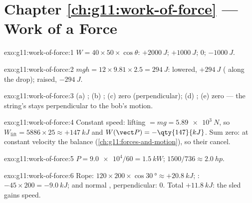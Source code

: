 \section*{Chapter \ref{ch:g11:work-of-force} --- Work of a Force}

\begin{solution}{exo:g11:work-of-force:1}
$W = 40 \times 50 \times \cos\theta$: $+\qty{2000}{J}$;
$+\qty{1000}{J}$; $0$; $-\qty{1000}{J}$.
\end{solution}

\begin{solution}{exo:g11:work-of-force:2}
$mgh = 12 \times 9.81 \times 2.5 = \qty{294}{J}$: lowered,
$+\qty{294}{J}$ ( along the drop); raised, $-\qty{294}{J}$.
\end{solution}

\begin{solution}{exo:g11:work-of-force:3}
(a) ; (b) ; (c) zero (perpendicular); (d) ;
(e) zero --- the string's  stays perpendicular to the bob's
motion.
\end{solution}

\begin{solution}{exo:g11:work-of-force:4}
Constant speed: lifting  $= mg = \qty{5.89e3}{N}$, so
$W_{\text{lift}} = 5886 \times 25 \approx +\qty{147}{kJ}$ and
$W(\vect P) = -\qty{147}{kJ}$. Sum zero: at constant velocity the
 balance (\cref{ch:g11:forces-and-motion}), so their 
cancel.
\end{solution}

\begin{solution}{exo:g11:work-of-force:5}
$P = \num{9.0e4}/60 = \qty{1.5}{kW}$; $1500/736 \approx \qty{2.0}{hp}$.
\end{solution}

\begin{solution}{exo:g11:work-of-force:6}
Rope: $120 \times 200 \times \cos\qty{30}{\degree} \approx
+\qty{20.8}{kJ}$; : $-45 \times 200 = -\qty{9.0}{kJ}$; 
and normal , perpendicular: $0$. Total $+\qty{11.8}{kJ}$: the
sled gains speed.
\end{solution}

